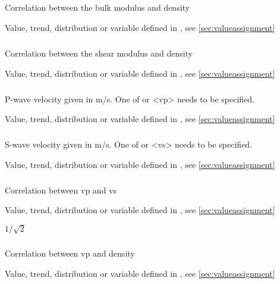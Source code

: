 {\subparagraph{}
 \slist
   \item \Description Correlation between the bulk modulus and density
   \item \Argument Value, trend, distribution or variable defined in , see \autoref{sec:valueassignment}
   \item {}
 \elist

\subparagraph{}
 \slist
   \item \Description Correlation between the shear modulus and density
   \item \Argument Value, trend, distribution or variable defined in , see \autoref{sec:valueassignment}
   \item {}
 \elist

\subparagraph{}
 \slist
   \item \Description P-wave velocity given in m/s. One of  or <vp> needs to be specified.
   \item \Argument Value, trend, distribution or variable defined in , see \autoref{sec:valueassignment}
   \item \Default 
 \elist

\subparagraph{}
 \slist
   \item \Description S-wave velocity given in m/s. One of  or <vs> needs to be specified.
   \item \Argument Value, trend, distribution or variable defined in , see \autoref{sec:valueassignment}
   \item \Default 
 \elist

\subparagraph{}
 \slist
   \item \Description Correlation between vp and vs
   \item \Argument Value, trend, distribution or variable defined in , see \autoref{sec:valueassignment}
   \item \Default $1/\sqrt{2}$
 \elist

\subparagraph{}
 \slist
   \item \Description Correlation between vp and density
   \item \Argument Value, trend, distribution or variable defined in , see \autoref{sec:valueassignment}
   \item {}
 \elist

}
